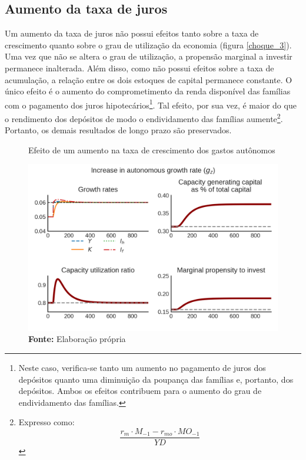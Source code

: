 \subsection{Aumento da taxa de juros}

Um aumento da taxa de juros não possui efeitos tanto sobre a taxa de crescimento quanto sobre o grau de utilização da economia (figura \ref{choque_3}). Uma vez que não se altera o grau de utilização, a propensão marginal a investir permanece inalterada. Além disso, como não possui efeitos sobre a taxa de acumulação, 
a relação entre os dois estoques de capital permanece constante. O único efeito é o aumento do comprometimento da renda disponível das famílias com o pagamento dos juros hipotecários\footnote{Neste caso, verifica-se tanto um aumento no pagamento de juros dos depósitos quanto uma diminuição da poupança das famílias e, portanto, dos depósitos. Ambos os efeitos contribuem para o aumento do grau de endividamento das famílias.}. Tal efeito, por sua vez, é maior do que o rendimento dos depósitos de modo o endividamento das famílias aumente\footnote{Expresso como:
$$
\frac{r_m\cdot M_{-1} - r_{mo}\cdot MO_{-1}}{YD}
$$
}. Portanto, os demais resultados de longo prazo são preservados.


\begin{figure}[htb]
    \centering
    \label{choque_1}
    \caption{Efeito de um aumento na taxa de crescimento dos gastos autônomos}
    \includegraphics{Modelo/Shock_1.png}
    \caption*{\textbf{Fonte:} Elaboração própria}
\end{figure}



